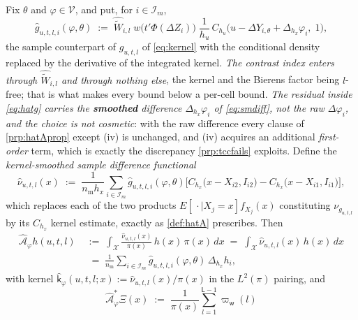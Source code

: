 \begin{definition}\label{def:hatAcon}
Fix $\theta$ and $\varphi\in\mathcal V$, and put, for $i\in\mathcal I_m$,
\begin{equation}\label{eq:hatg}
\hat g_{u,t,l,i}(\varphi,\theta)\;:=\;\widehat{\widetilde W}_{i,l}\;w\big(t'\Phi(\Delta Z_i)\big)\;
\frac1{h_u}\,C_{h_u}\big(u-\Delta Y_{i,\theta}+\Delta_{h_x}\varphi_i,\;1\big) ,
\end{equation}
the sample counterpart of $g_{u,t,l}$ of \eqref{eq:kernel} with the conditional density replaced by the
derivative of the integrated kernel. \emph{The contrast index enters through
$\widehat{\widetilde W}_{i,l}$ and through nothing else}, the kernel and the Bierens factor being
$l$-free; that is what makes every bound below a per-cell bound. \emph{The residual inside \eqref{eq:hatg} carries the
\textbf{smoothed} difference $\Delta_{h_x}\varphi_i$ of \eqref{eq:smdiff}, not the raw $\Delta\varphi_i$,
and the choice is not cosmetic}: with the raw difference every clause of \cref{prp:hatAprop} except
(iv) is unchanged, and (iv) acquires an additional \emph{first-order} term, which is exactly the
discrepancy \cref{prp:tccfails} exploits. Define the \emph{kernel-smoothed sample difference
functional}
\begin{equation}\label{eq:hatnu}
\hat\nu_{u,t,l}(x)\;:=\;\frac1{n_{\mathrm m}h_x}\sum_{i\in\mathcal I_m}\hat g_{u,t,l,i}(\varphi,\theta)
\Big[C_{h_x}\big(x-X_{i2},I_{i2}\big)-C_{h_x}\big(x-X_{i1},I_{i1}\big)\Big] ,
\end{equation}
which replaces each of the two products $E[\,\cdot\mid X_j=x]f_{X_j}(x)$ constituting $\nu_{g_{u,t,l}}$ by
its $C_{h_x}$ kernel estimate, exactly as \cref{def:hatA} prescribes. Then
\begin{equation}\label{eq:hatAcon}
\begin{split}
\hat{\mathcal A}_\varphi h(u,t,l)\;&:=\;\int_{\mathcal X}\frac{\hat\nu_{u,t,l}(x)}{\pi(x)}\,h(x)\,\pi(x)\,dx
\;=\;\int_{\mathcal X}\hat\nu_{u,t,l}(x)\,h(x)\,dx\\
&\;=\;\frac1{n_{\mathrm m}}\sum_{i\in\mathcal I_m}\hat g_{u,t,l,i}(\varphi,\theta)\,\Delta_{h_x}h_i ,
\end{split}
\end{equation}
with kernel $\hat{\mathsf k}_\varphi(u,t,l;x):=\hat\nu_{u,t,l}(x)/\pi(x)$ in the $L^2(\pi)$ pairing, and
\begin{equation}\label{eq:hatAadj}
\hat{\mathcal A}^\ast_\varphi\Xi(x)\;:=\;\frac1{\pi(x)}\sum_{l=1}^{\mathsf L-1}\varpi_{\mathsf w}(l)

\end{equation}
\end{definition}

